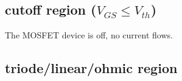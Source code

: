 \documentclass[11ypt]{extarticle}
\begin{document}

\subsection{cutoff region ($V_{GS} \leq V_{th}$)}

The MOSFET device is off, no current flows.

\subsection{triode/linear/ohmic region}
\end{document}
